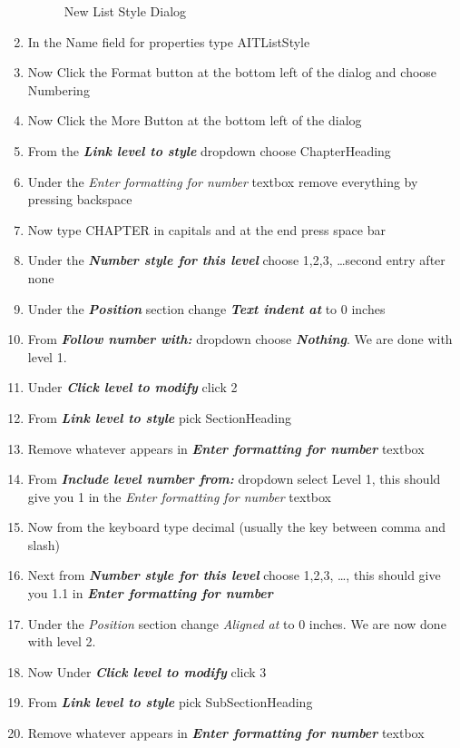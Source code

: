 \begin{enumerate}
\begin{figure}
    \caption{New List Style Dialog}
    \label{fig:liststyledialog}
    \end{figure}
    \item In the Name field for properties type AITListStyle
    \item Now Click the Format button at the bottom left of the dialog and choose Numbering
    \item Now Click the More Button at the bottom left of the dialog
    \item From the \textbf{\emph{Link level to style}} dropdown choose ChapterHeading
    \item Under the \emph{Enter formatting for number} textbox remove everything by pressing backspace
    \item Now type CHAPTER in capitals and at the end press space bar
    \item Under the \textbf{\emph{Number style for this level}} choose 1,2,3, \dots second entry after none
    \item Under the \textbf{\emph{Position}} section change \textbf{\emph{Text indent at}} to 0 inches 
    \item From \textbf{\emph{Follow number with:}} dropdown choose \textbf{\emph{Nothing}}. We are done with level 1.
    \item Under \textbf{\emph{Click level to modify}} click 2
    \item From \textbf{\emph{Link level to style}} pick SectionHeading
    \item Remove whatever appears in \textbf{\emph{Enter formatting for number}} textbox
     \item From \textbf{\emph{Include level number from: }} dropdown select Level 1, this should give you 1 in the \emph{Enter formatting for number} textbox
     \item Now from the keyboard type decimal (usually the key between comma and slash)
     \item Next from \textbf{\emph{Number style for this level}} choose 1,2,3, \dots, this should give you 1.1 in  \textbf{\emph{Enter formatting for number}}
     \item Under the \emph{Position} section change \emph{Aligned at} to 0 inches. We are now done with level 2.
    \item Now Under \textbf{\emph{Click level to modify}} click 3
    \item From \textbf{\emph{Link level to style}} pick SubSectionHeading
    \item Remove whatever appears in \textbf{\emph{Enter formatting for number}} textbox

\end{enumerate}
